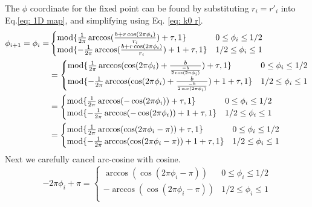 The $\phi$ coordinate for the fixed point can be found by substituting $r_i = r'_i$ into Eq.\ref{eq: 1D map}, and simplifying using Eq. \ref{eq: k0 r}.
\begin{align*}
    \phi_{i+1} = \phi_i = &
    \begin{cases}
    \textnormal{mod} \{\frac{1}{2\pi}\arccos(\frac{b+r \cos(2\pi \phi_i)}{r_i}) + \tau,1\} & 0 \leq \phi_i \leq 1/2 \\
    \textnormal{mod} \{-\frac{1}{2\pi}\arccos(\frac{b+r \cos(2\pi \phi_i)}{r_i}) + 1 +\tau ,1\}
    & 1/2 \leq \phi_i \leq 1 \\
    \end{cases}\\
    & =
    \begin{cases}
    \textnormal{mod} \{\frac{1}{2\pi}\arccos(\cos(2\pi\phi_i) + \frac{b}{\frac{-b}{2\cos(2\pi\phi_i)}}) + \tau,1\} & 0 \leq \phi_i \leq 1/2 \\
    \textnormal{mod} \{-\frac{1}{2\pi}\arccos(\cos(2\pi\phi_i) + \frac{b}{\frac{-b}{2\cos(2\pi\phi_i)}}) + 1 +\tau,1\} & 1/2 \leq \phi_i \leq 1 \\
    \end{cases}\\
    & =
    \begin{cases}
    \textnormal{mod} \{\frac{1}{2\pi}\arccos(-\cos(2\pi\phi_i)) + \tau ,1\} & 0 \leq \phi_i \leq 1/2 \\
    \textnormal{mod} \{-\frac{1}{2\pi}\arccos(-\cos(2\pi\phi_i)) + 1 +\tau,1\} & 1/2 \leq \phi_i \leq 1 \\
    \end{cases}\\
    & =
    \begin{cases}
    \textnormal{mod} \{\frac{1}{2\pi}\arccos(\cos(2\pi\phi_i - \pi)) + \tau,1\} & 0 \leq \phi_i \leq 1/2 \\
    \textnormal{mod} \{-\frac{1}{2\pi}\arccos(\cos(2\pi\phi_i - \pi)) + 1 +\tau ,1\} & 1/2 \leq \phi_i \leq 1 \\
    \end{cases}
\end{align*}
Next we carefully cancel arc-cosine with cosine.
\begin{equation} 
-2\pi\phi_i+\pi = 
    \begin{cases}
       \arccos(\cos(2\pi\phi_i-\pi)) & 0 \leq \phi_i \leq 1/2 \\
       -\arccos(\cos(2\pi\phi_i-\pi)) & 1/2 \leq \phi_i \leq 1 \\
    \end{cases}
    \label{eq:k0 arccos}
\end{equation}

